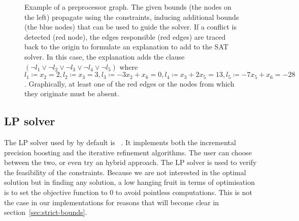 \documentclass[runningheads]{llncs}
\begin{document}
\begin{figure}[h]
    \caption{Example of a preprocessor graph. The given bounds (the nodes on the left) propagate using the constraints, inducing additional bounds (the blue nodes) that can be used to guide the solver.
        If a conflict is detected (red node), the edges responsible (red edges) are traced back to the origin to formulate an explanation to add to the SAT solver.
        In this case, the explanation adds the clause $(\neg l_1 \lor \neg l_2 \lor \neg l_3 \lor \neg l_4 \lor \neg l_5)$ where $l_1 \coloneqq x_2 = 2, l_2 \coloneqq x_3 = 3, l_3 \coloneqq -3x_2 + x_6 = 0, l_4 \coloneqq x_3 + 2x_5 = 13, l_5 \coloneqq -7x_5 + x_6 = -28$.
        Graphically, at least one of the red edges or the nodes from which they originate must be absent.}
    \label{dg:preprocessor}
\end{figure}

\subsection{LP solver}

The LP solver used by \dlinear by default is \soplex~\cite{ref:soplex}.
It implements both the incremental precision boosting and the iterative refinement algorithms.
The user can choose between the two, or even try an hybrid approach.
The LP solver is used to verify the feasibility of the constraints.
Because we are not interested in the optimal solution but in finding any solution, a low hanging fruit in terms of optimisation is to set the objective function to $0$ to avoid pointless computations.
This is not the case in our implementations for reasons that will become clear in section~\ref{sec:strict-bounds}.
\end{document}
